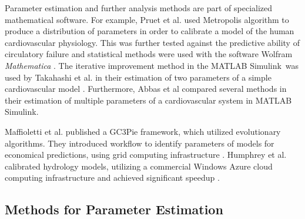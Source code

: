 
Parameter estimation and further analysis methods are part of specialized mathematical software. For example, Pruet et al. used Metropolis algorithm to produce a distribution of parameters in order to calibrate a model of the human cardiovascular physiology. This was further tested against the predictive ability of circulatory failure and statistical methods were used with the software Wolfram \textit{Mathematica} \cite{Pruett2013}. The iterative improvement method in the MATLAB Simulink\textregistered ~was used by Takahashi et al. in their estimation of two parameters of a simple cardiovascular model \cite{Takahashi2013}. Furthermore, Abbas et al compared several methods in their estimation of multiple parameters of a cardiovascular system in MATLAB Simulink\textregistered \cite{Abbass2012}.

Maffioletti et al. published a GC3Pie framework, which utilized evolutionary algorithms. They introduced workflow to identify parameters of models for economical predictions, using grid computing infrastructure \cite{maffioletti2012computational}. Humphrey et al. calibrated hydrology models, utilizing a commercial Windows Azure cloud computing infrastructure and achieved significant speedup \cite{Humphrey2012}.




\subsection{Methods for Parameter Estimation}
\label{sec:methodsestimation}

